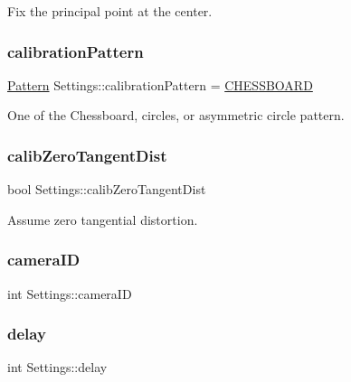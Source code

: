 Fix the principal point at the center. 

\mbox{\label{class_settings_a94551b7ffe8ac60311b035b2905e9498}} 
\subsubsection{\texorpdfstring{calibration\+Pattern}{calibrationPattern}}
{\footnotesize\ttfamily \mbox{\hyperlink{class_settings_a0e7117abd9427a6f8bc1d1d8d456b5c8}{Pattern}} Settings\+::calibration\+Pattern = \mbox{\hyperlink{class_settings_a0e7117abd9427a6f8bc1d1d8d456b5c8ae96aa2d60b4a554a215524a05b32908e}{C\+H\+E\+S\+S\+B\+O\+A\+RD}}}



One of the Chessboard, circles, or asymmetric circle pattern. 

\mbox{\label{class_settings_a4bc7ff147d74721a3587ce6fcb64ef32}} 
\subsubsection{\texorpdfstring{calib\+Zero\+Tangent\+Dist}{calibZeroTangentDist}}
{\footnotesize\ttfamily bool Settings\+::calib\+Zero\+Tangent\+Dist}



Assume zero tangential distortion. 

\mbox{\label{class_settings_af32a5ff06192bde106c934e0361bcd7e}} 
\subsubsection{\texorpdfstring{camera\+ID}{cameraID}}
{\footnotesize\ttfamily int Settings\+::camera\+ID}

\mbox{\label{class_settings_a5fe947366441009187d633f9e4663256}} 
\subsubsection{\texorpdfstring{delay}{delay}}
{\footnotesize\ttfamily int Settings\+::delay}



